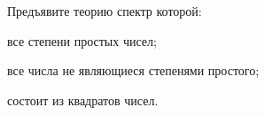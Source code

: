 Предъявите теорию спектр которой:
\begin{enumcyr}
    \item все степени простых чисел;
    \item все числа не являющиеся степенями простого;
    \item состоит из квадратов чисел.
\end{enumcyr}